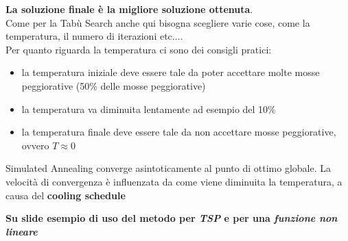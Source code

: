 \message{ !name(ro.tex)}\documentclass[a4paper,12pt, oneside]{book}
\begin{document}
\textbf{La soluzione finale è la migliore soluzione ottenuta}.\\
Come per la Tabù Search anche qui bisogna scegliere varie cose, come
la temperatura, il numero di iterazioni etc$\ldots$.\\
Per quanto riguarda la temperatura ci sono dei consigli pratici:
\begin{itemize}
  \item la temperatura iniziale deve essere tale da poter accettare
  molte mosse peggiorative (50\% delle mosse peggiorative)
  \item la temperatura va diminuita lentamente ad esempio del 10\%
  \item la temperatura finale deve essere tale da non accettare mosse
  peggiorative, ovvero $T\approx 0$
\end{itemize}
\begin{teorema}
  Simulated Annealing converge asintoticamente al punto di ottimo
  globale. La velocità di convergenza è influenzata da come viene
  diminuita la temperatura, a causa del \textbf{cooling schedule}
\end{teorema}
\textbf{Su slide esempio di uso del metodo per \textit{TSP} e per una
  \textit{funzione non lineare}}
\end{document}
